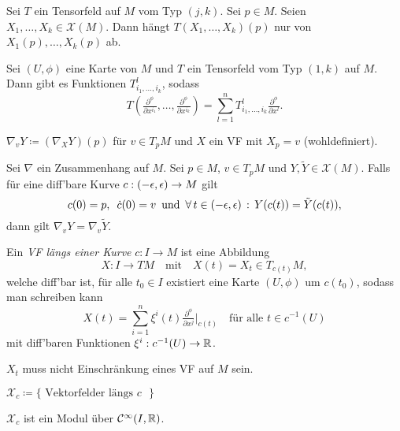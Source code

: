 \documentclass{cheat-sheet}
\newcommand{\coord}[1]{\tfrac{\partial^\phi}{\partial x^{#1}}} %
\newcommand{\vinterval}{\ointerval{-\epsilon}{\epsilon}} %
\newcommand{\Cont}{\mathcal{C}} %
\newcommand{\VF}{\mathcal{X}} %
\begin{document}
\begin{satz}
  Sei $T$ ein Tensorfeld auf $M$ vom Typ $(j, k)$. Sei $p \in M$. Seien $X_1, \ldots, X_k \in \VF(M)$. Dann hängt $T(X_1, \ldots, X_k)(p)$ nur von $X_1(p), \ldots, X_k(p)$ ab.
\end{satz}


\begin{bem}
  Sei $(U, \phi)$ eine Karte von $M$ und $T$ ein Tensorfeld vom Typ $(1, k)$ auf $M$. Dann gibt es Funktionen $T_{i_1, \ldots, i_k}^l$, sodass
  \[ T(\coord{i_1}, \ldots, \coord{i_k}) = \sum_{l=1}^n T_{i_1, \ldots, i_k}^l \coord{l}. \]
\end{bem}

\begin{nota}
  $\nabla_v Y \coloneqq (\nabla_X Y)(p)$ für $v \in T_p M$ und $X$ ein VF mit $X_p = v$ (wohldefiniert).
\end{nota}

\begin{satz}
  Sei $\nabla$ ein Zusammenhang auf $M$. Sei $p \in M$, $v \in T_p M$ und $Y, \tilde{Y} \in \VF(M)$. Falls für eine diff'bare Kurve $c : \vinterval \to M$ gilt
  \[
    c(0) = p, \enspace
    \dot{c}(0) = v \enspace \text{und} \enspace
    \fa{t \in \vinterval} Y(c(t)) = \tilde{Y}(c(t)),
  \]
  dann gilt $\nabla_v Y = \nabla_v \tilde{Y}$.
\end{satz}


\begin{defn}
  Ein \emph{VF längs einer Kurve} $c : I \to M$ ist eine Abbildung
  \[
    X : I \to TM
    \quad \text{mit} \quad
    X(t) = X_t \in T_{c(t)} M,
  \]
  welche diff'bar ist, \dh{} für alle $t_0 \in I$ existiert eine Karte $(U, \phi)$ um $c(t_0)$, sodass man schreiben kann
  \[
    X(t) = \sum_{i=1}^n \xi^i(t) \coord{j}|_{c(t)} \quad \text{für alle } t \in c^{-1}(U)
  \]
  mit diff'baren Funktionen $\xi^i : c^{-1}(U) \to \mathbb{R}$.
\end{defn}

\begin{bem}
  $X_t$ muss nicht Einschränkung eines VF auf $M$ sein.
\end{bem}

\begin{nota}
  $\VF_c \coloneqq \{ \text{ Vektorfelder längs $c$ } \}$
\end{nota}

\begin{bem}
  $\VF_c$ ist ein Modul über $\Cont^\infty(I, \R)$.
\end{bem}
\end{document}

